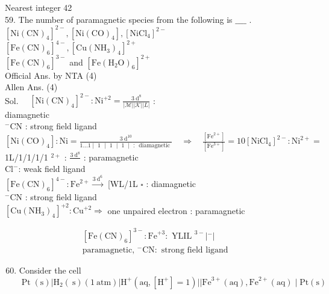 \documentclass[10pt]{article}
\begin{document}
Nearest integer 42\\
59. The number of paramagnetic species from the following is \(\_\_\_\_\) .\\
\(\left[\mathrm{Ni}(\mathrm{CN})_{4}\right]^{2-},\left[\mathrm{Ni}(\mathrm{CO})_{4}\right],\left[\mathrm{NiCl}_{4}\right]^{2-}\)\\
\(\left[\mathrm{Fe}(\mathrm{CN})_{6}\right]^{4-},\left[\mathrm{Cu}\left(\mathrm{NH}_{3}\right)_{4}\right]^{2+}\)\\
\(\left[\mathrm{Fe}(\mathrm{CN})_{6}\right]^{3-}\) and \(\left[\mathrm{Fe}\left(\mathrm{H}_{2} \mathrm{O}\right)_{6}\right]^{2+}\)\\
Official Ans. by NTA (4)\\
Allen Ans. (4)\\
Sol. \(\quad\left[\mathrm{Ni}(\mathrm{CN})_{4}\right]^{2-}: \mathrm{Ni}^{+2}=\frac{3 \mathrm{~d}^{8}}{|\mathcal{M}||\mathcal{K}||L|}\) :\\
diamagnetic\\
\({ }^{-} \mathrm{CN}\) : strong field ligand\\
\(\left[\mathrm{Ni}(\mathrm{CO})_{4}\right]: \mathrm{Ni}=\frac{3 \mathrm{~d}^{10}}{1 \ldots 1 \mid \text { 1 } \mid \text { 1 } \mid \text { 1 } \mid \text { : } \text { diamagnetic }} \quad \Rightarrow \quad \frac{\left[\mathrm{Fe}^{2+}\right]}{\left[\mathrm{Fe}^{3+}\right]}=10 \left[\mathrm{NiCl}_{4}\right]^{2-}: \mathrm{Ni}^{2+}=\quad\) 1L/1/1/1/1 \({ }^{2+}\) : \(\frac{3 \mathrm{~d}^{8}}{}\) : paramagnetic\\
\(\mathrm{Cl}^{-}\): weak field ligand\\
\(\left[\mathrm{Fe}(\mathrm{CN})_{6}\right]^{4-}: \mathrm{Fe}^{2+} \xrightarrow{3 \mathrm{~d}^{6}}\) [WL/1L \(\square\) : diamagnetic\\
\({ }^{-} \mathrm{CN}\) : strong field ligand\\
\(\left[\mathrm{Cu}\left(\mathrm{NH}_{3}\right)_{4}\right]^{+2}: \mathrm{Cu}^{+2} \Rightarrow\) one unpaired electron : paramagnetic

\[
\begin{gathered}
{\left[\mathrm{Fe}(\mathrm{CN})_{6}\right]^{3-}: \mathrm{Fe}^{+3}: \text { YLIL }^{3-}\left|{ }^{-}\right|} \\
\text {paramagnetic, }{ }^{-} \mathrm{CN}: \text { strong field ligand }
\end{gathered}
\]

\begin{enumerate}
  \setcounter{enumi}{59}
  \item Consider the cell\\
\(\operatorname{Pt}(\mathrm{s})\left|\mathrm{H}_{2}(\mathrm{~s})(1 \mathrm{~atm})\right| \mathrm{H}^{+}\left(\mathrm{aq},\left[\mathrm{H}^{+}\right]=1\right)| | \mathrm{Fe}^{3+}(\mathrm{aq}), \mathrm{Fe}^{2+}(\mathrm{aq}) \mid \mathrm{Pt}(\mathrm{s})\)
\end{enumerate}
\end{document}
